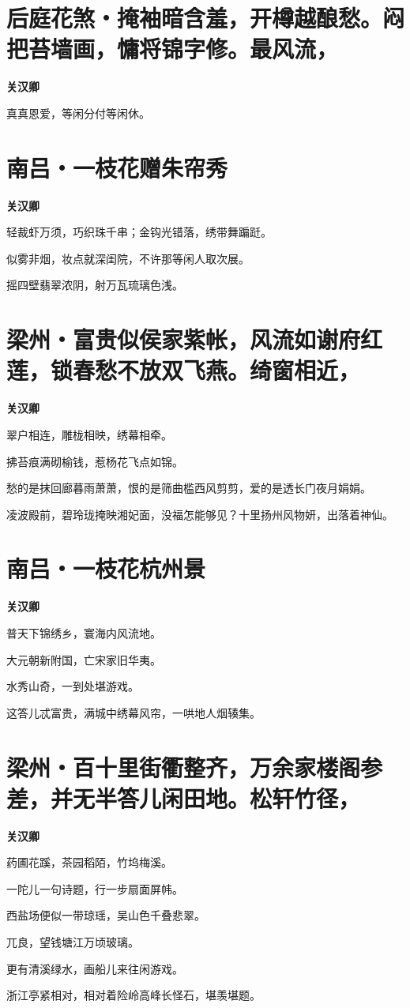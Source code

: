 \documentclass[12pt,a4paper]{ctexbook}
\begin{document}
\section{后庭花煞・掩袖暗含羞，开樽越酿愁。闷把苔墙画，慵将锦字修。最风流，}
\textbf{关汉卿}\par\vspace{0.5em}
真真恩爱，等闲分付等闲休。\par

\section{南吕・一枝花赠朱帘秀}
\textbf{关汉卿}\par\vspace{0.5em}
轻裁虾万须，巧织珠千串；金钩光错落，绣带舞蹁跹。\par
似雾非烟，妆点就深闺院，不许那等闲人取次展。\par
摇四壁翡翠浓阴，射万瓦琉璃色浅。\par

\section{梁州・富贵似侯家紫帐，风流如谢府红莲，锁春愁不放双飞燕。绮窗相近，}
\textbf{关汉卿}\par\vspace{0.5em}
翠户相连，雕栊相映，绣幕相牵。\par
拂苔痕满砌榆钱，惹杨花飞点如锦。\par
愁的是抹回廊暮雨萧萧，恨的是筛曲槛西风剪剪，爱的是透长门夜月娟娟。\par
凌波殿前，碧玲珑掩映湘妃面，没福怎能够见？十里扬州风物妍，出落着神仙。\par

\section{南吕・一枝花杭州景}
\textbf{关汉卿}\par\vspace{0.5em}
普天下锦绣乡，寰海内风流地。\par
大元朝新附国，亡宋家旧华夷。\par
水秀山奇，一到处堪游戏。\par
这答儿忒富贵，满城中绣幕风帘，一哄地人烟辏集。\par

\section{梁州・百十里街衢整齐，万余家楼阁参差，并无半答儿闲田地。松轩竹径，}
\textbf{关汉卿}\par\vspace{0.5em}
药圃花蹊，茶园稻陌，竹坞梅溪。\par
一陀儿一句诗题，行一步扇面屏帏。\par
西盐场便似一带琼瑶，吴山色千叠悲翠。\par
兀良，望钱塘江万顷玻璃。\par
更有清溪绿水，画船儿来往闲游戏。\par
浙江亭紧相对，相对着险岭高峰长怪石，堪羡堪题。\par
\end{document}
